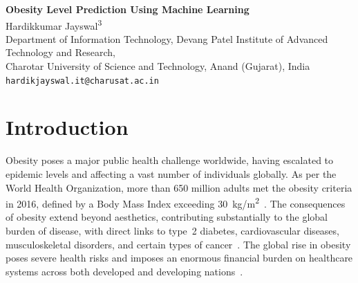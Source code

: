 \documentclass[12pt, a4paper]{article}
\begin{document}
\begin{center}
  {\Large \textbf{Obesity Level Prediction Using Machine Learning}}\\[1em]
  Hardikkumar Jayswal\textsuperscript{3}~\\[0.5em]
  \small
  Department of Information Technology, Devang Patel Institute of Advanced Technology and Research,\\
  Charotar University of Science and Technology, Anand (Gujarat), India\\[0.3em]
  \texttt{hardikjayswal.it@charusat.ac.in}
\end{center}

\begin{abstract}
Obesity has become a significant global health concern due to its association with
various non-communicable diseases. Traditional methods for obesity assessment,
such as BMI, often fail to capture the complexity of the condition, highlighting the
need for more accurate predictive tools. This research utilizes machine learning
algorithms, including Random Forest, Gradient Boosting, Support Vector Machines,
and Neural Networks, in a stacking ensemble model to predict obesity levels.
Utilizing datasets from diverse populations, the model achieved a high accuracy of
96.69\%. Key features such as BMI, age, and dietary habits were identified as critical
predictors through Recursive Feature Elimination. The research findings demonstrate
the potential of advanced data-driven techniques in providing personalized insights
into obesity management and underscore the transformative role of machine learning
in public health initiatives.

\textbf{Keywords:} Machine Learning, Recursive Feature Elimination, Obesity.
\end{abstract}

\section{Introduction}

Obesity poses a major public health challenge worldwide, having escalated to epidemic
levels and affecting a vast number of individuals globally. As per the World Health
Organization, more than 650 million adults met the obesity criteria in 2016, defined by a
Body Mass Index exceeding 30~kg/m\textsuperscript{2}~\cite{who2016}. The consequences
of obesity extend beyond aesthetics, contributing substantially to the global burden of
disease, with direct links to type~2 diabetes, cardiovascular diseases, musculoskeletal
disorders, and certain types of cancer~\cite{who2016}. The global rise in obesity poses
severe health risks and imposes an enormous financial burden on healthcare systems across
both developed and developing nations~\cite{hammond2010}.
\end{document}

